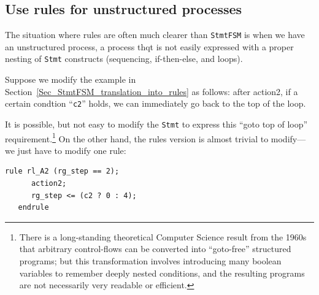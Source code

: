 
\subsection{Use rules for unstructured processes}

The situation where rules are often much clearer than \verb|StmtFSM|
is when we have an unstructured process, {\ie} a process thqt is not
easily expressed with a proper nesting of \verb|Stmt| constructs
(sequencing, if-then-else, and loops).

Suppose we modify the example in
Section~\ref{Sec_StmtFSM_translation_into_rules} as follows: after
action2, if a certain condtion ``\verb|c2|'' holds, we can immediately
go back to the top of the loop.

It is possible, but not easy to modify the \verb|Stmt| to express this
``goto top of loop'' requirement.\footnote{There is a long-standing
theoretical Computer Science result from the 1960s that arbitrary
control-flows can be converted into ``goto-free'' structured programs;
but this transformation involves introducing many boolean variables to
remember deeply nested conditions, and the resulting programs are not
necessarily very readable or efficient.}  On the other hand, the rules
version is almost trivial to modify---we just have to modify one rule:

{\small
\begin{Verbatim}[frame=single,label=BSV]
   rule rl_A2 (rg_step == 2);
      action2;
      rg_step <= (c2 ? 0 : 4);
   endrule
\end{Verbatim}
}

